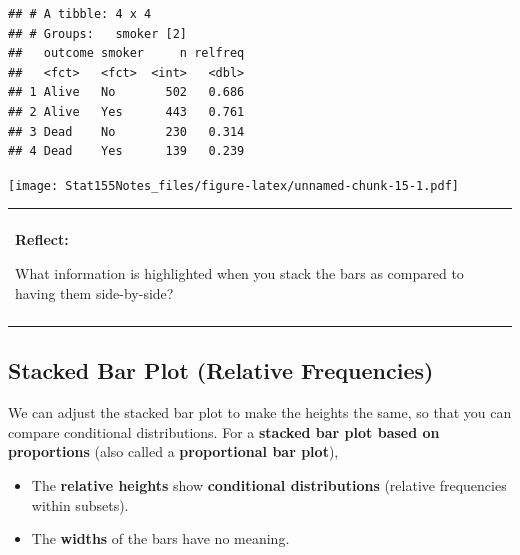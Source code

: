 \documentclass[]{book}
\newenvironment{Shaded}{\begin{snugshade}}{\end{snugshade}}
\newcommand{\CommentTok}[1]{\textcolor[rgb]{0.56,0.35,0.01}{\textit{#1}}}
\newcommand{\DataTypeTok}[1]{\textcolor[rgb]{0.13,0.29,0.53}{#1}}
\newcommand{\KeywordTok}[1]{\textcolor[rgb]{0.13,0.29,0.53}{\textbf{#1}}}
\newcommand{\NormalTok}[1]{#1}
\newcommand{\OperatorTok}[1]{\textcolor[rgb]{0.81,0.36,0.00}{\textbf{#1}}}
\newcommand{\StringTok}[1]{\textcolor[rgb]{0.31,0.60,0.02}{#1}}
\providecommand{\tightlist}{%
  \setlength{\itemsep}{0pt}\setlength{\parskip}{0pt}}
\newenvironment{reflect}
{
    \begin{center}
    
    \begin{tabular}{|p{0.8\textwidth}|}
    \rowcolor{LightBlue}
    \hline\\
    \rowcolor{LightBlue}
    \textbf{Reflect:}
}
{
    \\\rowcolor{LightBlue}
    \\\hline
    \end{tabular} 
    \end{center}
}
\begin{document}
\begin{verbatim}
## # A tibble: 4 x 4
## # Groups:   smoker [2]
##   outcome smoker     n relfreq
##   <fct>   <fct>  <int>   <dbl>
## 1 Alive   No       502   0.686
## 2 Alive   Yes      443   0.761
## 3 Dead    No       230   0.314
## 4 Dead    Yes      139   0.239
\end{verbatim}

\begin{Shaded}
\end{Shaded}

\texttt{[image: Stat155Notes\_files/figure-latex/unnamed-chunk-15-1.pdf]}

\begin{reflect}
What information is highlighted when you stack the bars as compared to
having them side-by-side?
\end{reflect}

\hypertarget{stacked-bar-plot-relative-frequencies}{%
\subsection{Stacked Bar Plot (Relative Frequencies)}\label{stacked-bar-plot-relative-frequencies}}

We can adjust the stacked bar plot to make the heights the same, so that you can compare conditional distributions. For a \textbf{stacked bar plot based on proportions} (also called a \textbf{proportional bar plot}),

\begin{itemize}
\tightlist
\item
  The \textbf{relative heights} show \textbf{conditional distributions} (relative frequencies within subsets).
\item
  The \textbf{widths} of the bars have no meaning.
\end{itemize}
\end{document}
